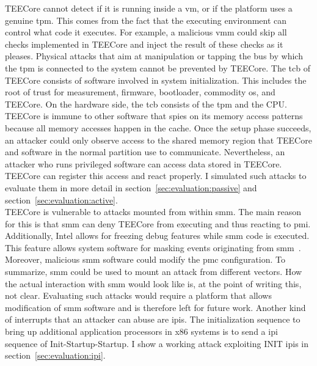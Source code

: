 TEECore cannot detect if it is running inside a \gls{vm}, or if the platform
uses a genuine \gls{tpm}. This comes from the fact that the executing
environment can control what code it executes. For example, a malicious
\gls{vmm} could skip all checks implemented in TEECore and inject the result of
these checks as it pleases. Physical attacks that aim at manipulation or tapping
the bus by which the \gls{tpm} is connected to the system cannot be prevented by
TEECore. The \gls{tcb} of TEECore consists of software involved in system
initialization. This includes the root of trust for measurement, firmware,
bootloader, commodity \gls{os}, and TEECore. On the hardware side, the \gls{tcb}
consists of the \gls{tpm} and the CPU.\\

TEECore is immune to other software that spies on its memory access patterns
because all memory accesses happen in the cache. Once the setup phase succeeds,
an attacker could only observe access to the shared memory region that TEECore
and software in the normal partition use to communicate. Nevertheless, an
attacker who runs privileged software can access data stored in TEECore. TEECore
can register this access and react properly. I simulated such attacks to
evaluate them in more detail in section~\ref{sec:evaluation:passive} and
section~\ref{sec:evaluation:active}.\\

TEECore is vulnerable to attacks mounted from within \gls{smm}. The main reason
for this is that \gls{smm} can deny TEECore from executing and thus reacting to
\gls{pmi}. Additionally, Intel allows for freezing debug features while
\gls{smm} code is executed. This feature allows system software for masking
events originating from \gls{smm}~\cite{intel_sdm}. Moreover, malicious
\gls{smm} software could modify the \gls{pmc} configuration. To summarize,
\gls{smm} could be used to mount an attack from different vectors. How the
actual interaction with \gls{smm} would look like is, at the point of writing
this, not clear. Evaluating such attacks would require a platform that allows
modification of \gls{smm} software and is therefore left for future work.
Another kind of interrupts that an attacker can abuse are \glspl{ipi}. The
initialization sequence to bring up additional application processors in x86
systems is to send a \gls{ipi} sequence of Init-Startup-Startup. I show a
working attack exploiting INIT \glspl{ipi} in
section~\ref{sec:evaluation:ipi}.

